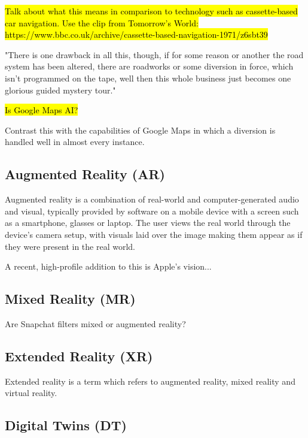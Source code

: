 \documentclass{article}
\begin{document}

\hl{Talk about what this means in comparison to technology such as cassette-based car navigation. Use the clip from Tomorrow's World: https://www.bbc.co.uk/archive/cassette-based-navigation-1971/z6sbt39}

"There is one drawback in all this, though, if for some reason or another the road system has been altered, there are roadworks or some diversion in force, which isn't programmed on the tape, well then this whole business just becomes one glorious guided mystery tour."

\hl{Is Google Maps AI?}

Contrast this with the capabilities of Google Maps in which a diversion is handled well in almost every instance.

\subsection{Augmented Reality (AR)}

Augmented reality is a combination of real-world and computer-generated audio and visual, typically provided by software on a mobile device with a screen such as a smartphone, glasses or laptop. The user views the real world through the device's camera setup, with visuals laid over the image making them appear as if they were present in the real world.

A recent, high-profile addition to this is Apple's vision...



\subsection{Mixed Reality (MR)}


Are Snapchat filters mixed or augmented reality?

\subsection{Extended Reality (XR)}

Extended reality is a term which refers to augmented reality, mixed reality and virtual reality. 

\subsection{Digital Twins (DT)}
\end{document}
